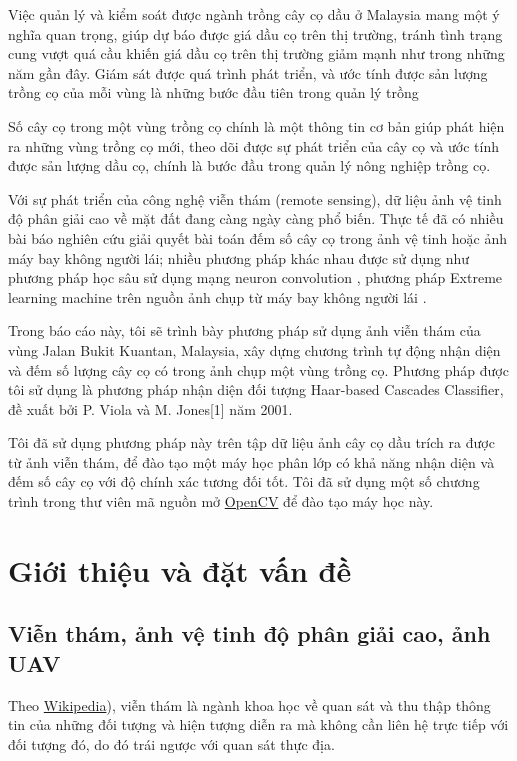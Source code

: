 \documentclass[14pt, oneside, a4paper, openany]{scrartcl}
\begin{document}
Việc quản lý và kiểm soát được ngành trồng cây cọ dầu ở Malaysia mang một ý nghĩa quan trọng, giúp dự báo được giá dầu cọ trên thị trường, tránh tình trạng cung vượt quá cầu khiến giá dầu cọ trên thị trường giảm mạnh như trong những năm gần đây. Giám sát được quá trình phát triển, và ước tính được sản lượng trồng cọ của mỗi vùng là những bước đầu tiên trong quản lý trồng 


Số cây cọ trong một vùng trồng cọ chính là một thông tin cơ bản giúp phát hiện ra những vùng trồng cọ mới, theo dõi được sự phát triển của cây cọ và ước tính được sản lượng dầu cọ, chính là bước đầu trong quản lý nông nghiệp trồng cọ.

Với sự phát triển của công nghệ viễn thám (remote sensing), dữ liệu ảnh vệ tinh độ phân giải cao về mặt đất đang càng ngày càng phổ biến. Thực tế đã có nhiều bài báo nghiên cứu giải quyết bài toán đếm số cây cọ trong ảnh vệ tinh hoặc ảnh máy bay không người lái; nhiều phương pháp khác nhau được sử dụng như phương pháp học sâu sử dụng mạng neuron convolution \cite{deeptree}, phương pháp Extreme learning machine trên nguồn ảnh chụp từ máy bay không người lái \cite{efficientUAV}.

Trong báo cáo này, tôi sẽ trình bày phương pháp sử dụng ảnh viễn thám của vùng Jalan Bukit Kuantan, Malaysia, xây dựng chương trình tự động nhận diện và đếm số lượng cây cọ có trong ảnh chụp một vùng trồng cọ. Phương pháp được tôi sử dụng là phương pháp nhận diện đối tượng Haar-based Cascades Classifier, đề xuất bởi P. Viola và M. Jones[1] năm 2001.

Tôi đã sử dụng phương pháp này trên tập dữ liệu ảnh cây cọ dầu trích ra được từ ảnh viễn thám, để đào tạo một máy học phân lớp có khả năng nhận diện và đếm số cây cọ với độ chính xác tương đối tốt. Tôi đã sử dụng một số chương trình trong thư viên mã nguồn mở \href{http://opencv.org}{OpenCV} \cite{opencv} để đào tạo máy học này.

\newpage
\section{Giới thiệu và đặt vấn đề}
\subsection{Viễn thám, ảnh vệ tinh độ phân giải cao, ảnh UAV}
Theo \href{https://en.wikipedia.org/wiki/Remote_sensing}{Wikipedia})\cite{remotesens}, viễn thám  là ngành khoa học về quan sát và thu thập thông tin của những đối tượng và hiện tượng diễn ra mà không cần liên hệ trực tiếp với đối tượng đó, do đó trái ngược với quan sát thực địa.
\end{document}
